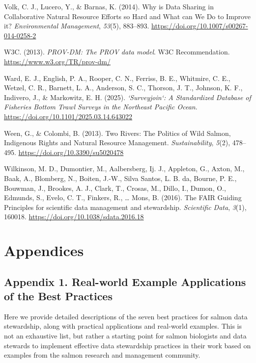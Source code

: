 \documentclass[
  letterpaper,
  DIV=11,
  numbers=noendperiod]{scrartcl}
\newlength{\cslhangindent}
\newenvironment{CSLReferences}[2] %
 {\begin{list}{}{%
  \setlength{\itemindent}{0pt}
  \setlength{\leftmargin}{0pt}
  \setlength{\parsep}{0pt}
  \ifodd #1
   \setlength{\leftmargin}{\cslhangindent}
   \setlength{\itemindent}{-1\cslhangindent}
  \fi
  \setlength{\itemsep}{#2\baselineskip}}}
 {\end{list}}
\begin{document}
\begin{CSLReferences}{1}{0}
Volk, C. J., Lucero, Y., \& Barnas, K. (2014). Why is Data Sharing in
Collaborative Natural Resource Efforts so Hard and What can We Do to
Improve it? \emph{Environmental Management}, \emph{53}(5), 883--893.
\url{https://doi.org/10.1007/s00267-014-0258-2}

W3C. (2013). \emph{{PROV-DM}: The {PROV} data model}. W3C
Recommendation. \url{https://www.w3.org/TR/prov-dm/}

Ward, E. J., English, P. A., Rooper, C. N., Ferriss, B. E., Whitmire, C.
E., Wetzel, C. R., Barnett, L. A., Anderson, S. C., Thorson, J. T.,
Johnson, K. F., Indivero, J., \& Markowitz, E. H. (2025).
\emph{`Surveyjoin`: {A} {Standardized} {Database} of {Fisheries}
{Bottom} {Trawl} {Surveys} in the {Northeast} {Pacific} {Ocean}}.
\url{https://doi.org/10.1101/2025.03.14.643022}

Ween, G., \& Colombi, B. (2013). Two Rivers: The Politics of Wild
Salmon, Indigenous Rights and Natural Resource Management.
\emph{Sustainability}, \emph{5}(2), 478--495.
\url{https://doi.org/10.3390/su5020478}

Wilkinson, M. D., Dumontier, M., Aalbersberg, Ij. J., Appleton, G.,
Axton, M., Baak, A., Blomberg, N., Boiten, J.-W., Silva Santos, L. B.
da, Bourne, P. E., Bouwman, J., Brookes, A. J., Clark, T., Crosas, M.,
Dillo, I., Dumon, O., Edmunds, S., Evelo, C. T., Finkers, R., \ldots{}
Mons, B. (2016). The FAIR Guiding Principles for scientific data
management and stewardship. \emph{Scientific Data}, \emph{3}(1), 160018.
\url{https://doi.org/10.1038/sdata.2016.18}

\end{CSLReferences}

\section{Appendices}\label{appendices}

\subsection{Appendix 1. Real-world Example Applications of the Best
Practices}\label{appendix-1.-real-world-example-applications-of-the-best-practices}

Here we provide detailed descriptions of the seven best practices for
salmon data stewardship, along with practical applications and
real-world examples. This is not an exhaustive list, but rather a
starting point for salmon biologists and data stewards to implement
effective data stewardship practices in their work based on examples
from the salmon research and management community.
\end{document}
